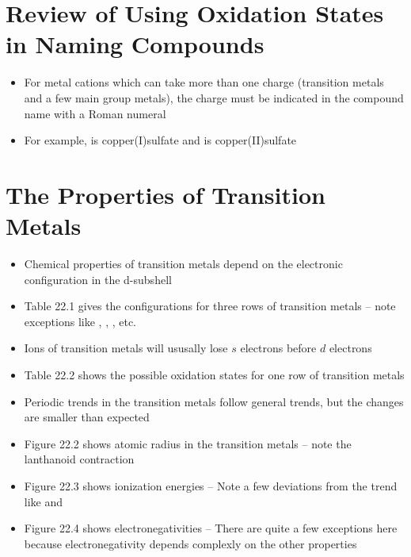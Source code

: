 \documentclass[12pt, openany, letterpaper]{memoir}
\begin{document}
\section{Review of Using Oxidation States in Naming Compounds}
\begin{itemize}
	\item For metal cations which can take more than one charge (transition metals and a few main group metals), the charge must be indicated in the compound name with a Roman numeral
	\item For example,  is copper(I)sulfate and  is copper(II)sulfate
\end{itemize}
\section{The Properties of Transition Metals}
\begin{itemize}
	\item Chemical properties of transition metals depend on the electronic configuration in the d-subshell
	\item Table 22.1 gives the configurations for three rows of transition metals -- note exceptions like , , , etc.
	\item Ions of transition metals will ususally lose $s$ electrons before $d$ electrons
	\item Table 22.2 shows the possible oxidation states for one row of transition metals
	\item Periodic trends in the transition metals follow general trends, but the changes are smaller than expected
	\item Figure 22.2 shows atomic radius in the transition metals -- note the lanthanoid contraction
	\item Figure 22.3 shows ionization energies -- Note a few deviations from the trend like  and 
	\item Figure 22.4 shows electronegativities -- There are quite a few exceptions here because electronegativity depends complexly on the other properties
\end{itemize}
\end{document}
